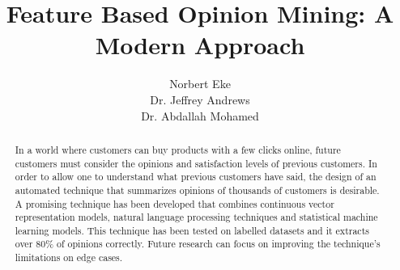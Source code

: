 \documentclass{sig-alternate}
\begin{document}
\title{Feature Based Opinion Mining: A Modern Approach}

\author{
\alignauthor
Norbert Eke\\
\alignauthor Dr. Jeffrey Andrews \\
\alignauthor Dr. Abdallah Mohamed\\
}


\maketitle
\begin{abstract}
In a world where customers can buy products with a few clicks online, future customers must consider the opinions and satisfaction levels of previous customers. In order to allow one to understand what previous customers have said, the design of an automated technique that summarizes opinions of thousands of customers is desirable. A promising technique has been developed that combines continuous vector representation models, natural language processing techniques and statistical machine learning models. This technique has been tested on labelled datasets and it extracts over 80\% of opinions correctly. Future research can focus on improving the technique's limitations on edge cases.
\end{abstract}

\end{document}
